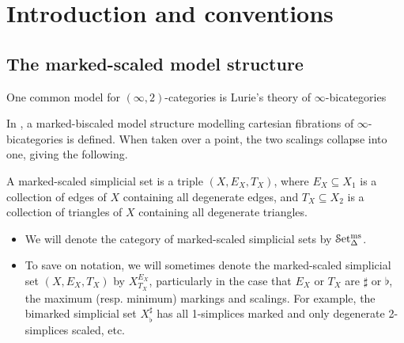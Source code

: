 \documentclass[main.tex]{subfiles}
\begin{document}
\section{Introduction and conventions}
\label{sec:introduction_and_conventions}

\subsection{The marked-scaled model structure}
\label{ssc:marked-scaled_model_structure}

One common model for $(\infty,2)$-categories is Lurie's theory of $\infty$-bicategories

In \cite{garcia20212}, a marked-biscaled model structure modelling cartesian fibrations of $\infty$-bicategories is defined. When taken over a point, the two scalings collapse into one, giving the following.

\begin{definition}
  \label{def:marked-scaled_simplicial_set}
  A marked-scaled simplicial set is a triple $(X, E_{X}, T_{X})$, where $E_{X} \subseteq X_{1}$ is a collection of edges of $X$ containing all degenerate edges, and $T_{X} \subseteq X_{2}$ is a collection of triangles of $X$ containing all degenerate triangles.
\end{definition}

\begin{notation}
  \leavevmode
  \begin{itemize}
    \item We will denote the category of marked-scaled simplicial sets by $\mathcal{S}\mathrm{et}_{\Delta}^{\mathrm{ms}}$.

    \item To save on notation, we will sometimes denote the marked-scaled simplicial set $(X, E_{X}, T_{X})$ by $X^{E_{X}}_{T_{X}}$, particularly in the case that $E_{X}$ or $T_{X}$ are $\sharp$ or $\flat$, the maximum (resp. minimum) markings and scalings. For example, the bimarked simplicial set $X^{\sharp}_{\flat}$ has all 1-simplices marked and only degenerate 2-simplices scaled, etc.
  \end{itemize}
\end{notation}
\end{document}
